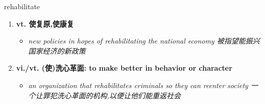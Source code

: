 
\begin{frame}
{\huge rehabilitate}
\begin{center}
\begin{enumerate}\Large
  \item \textbf{vt. 使复原,使康复}
  \begin{itemize}
    \item \em{\Large{new policies in hopes of rehabilitating the national economy 被指望能振兴国家经济的新政策}}
  \end{itemize}
  \item \textbf{vi./vt. (使)洗心革面: to make better in behavior or character}
  \begin{itemize}
    \item \em{\Large{an organization that rehabilitates criminals so they can reenter society 一个让罪犯洗心革面的机构,以便让他们能重返社会}}
  \end{itemize}
\end{enumerate}
\end{center}
\end{frame}
